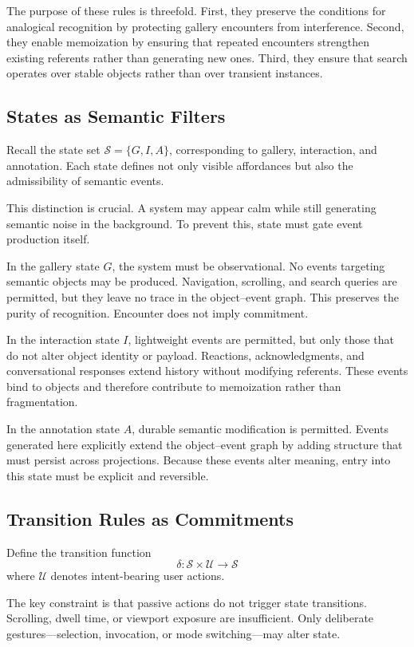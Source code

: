 \documentclass[11pt,oneside]{article}
\begin{document}
The purpose of these rules is threefold. First, they preserve the conditions for analogical recognition by protecting gallery encounters from interference. Second, they enable memoization by ensuring that repeated encounters strengthen existing referents rather than generating new ones. Third, they ensure that search operates over stable objects rather than over transient instances.

\subsection{States as Semantic Filters}

Recall the state set $\mathcal{S} = \{G, I, A\}$, corresponding to gallery, interaction, and annotation. Each state defines not only visible affordances but also the admissibility of semantic events.

This distinction is crucial. A system may appear calm while still generating semantic noise in the background. To prevent this, state must gate event production itself.

In the gallery state $G$, the system must be observational. No events targeting semantic objects may be produced. Navigation, scrolling, and search queries are permitted, but they leave no trace in the object–event graph. This preserves the purity of recognition. Encounter does not imply commitment.

In the interaction state $I$, lightweight events are permitted, but only those that do not alter object identity or payload. Reactions, acknowledgments, and conversational responses extend history without modifying referents. These events bind to objects and therefore contribute to memoization rather than fragmentation.

In the annotation state $A$, durable semantic modification is permitted. Events generated here explicitly extend the object–event graph by adding structure that must persist across projections. Because these events alter meaning, entry into this state must be explicit and reversible.

\subsection{Transition Rules as Commitments}

Define the transition function
\[
\delta : \mathcal{S} \times \mathcal{U} \rightarrow \mathcal{S}
\]
where $\mathcal{U}$ denotes intent-bearing user actions.

The key constraint is that passive actions do not trigger state transitions. Scrolling, dwell time, or viewport exposure are insufficient. Only deliberate gestures—selection, invocation, or mode switching—may alter state.
\end{document}
